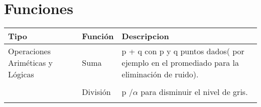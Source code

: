 \documentclass[letterpaper]{article}
\begin{document}
\section{Funciones}

\begin{table}[H]

	\centering
    
	\begin{tabular}[13cm]{ 
    >{\centering\arraybackslash}m{3cm} 
    >{}m{5cm} 
    >{}m{5cm}}
		
        \toprule
        
		\large{Tipo} & \large{Función} & \large{Descripcion} \\
        
		\midrule
        
        Operaciones Ariméticas y Lógicas 
        
        & Suma & p + q con p y q puntos dados( por ejemplo en el promediado para la eliminación de ruido). \\ \\
        
        & División & p /$ \alpha $ para disminuir el nivel de gris.\\ \\
       
        
        \bottomrule
        
	\end{tabular}
    
\end{table}
\end{document}
